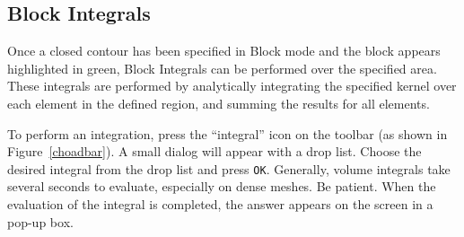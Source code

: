 \documentclass[12pt]{report}
\begin{document}
\subsection{Block Integrals}
Once a closed contour has been specified in Block mode and the
block appears highlighted in green, Block Integrals can be performed over
the specified area. These integrals are performed by analytically
integrating the specified kernel over each element in the defined
region, and summing the results for all elements.

To perform an integration, press the ``integral'' icon on the
toolbar (as shown in Figure~\ref{choadbar}).  A small dialog will
appear with a drop list.  Choose the desired integral from the drop
list and press {\tt OK}.  Generally, volume integrals take several
seconds to evaluate, especially on dense meshes.  Be patient. When
the evaluation of the integral is completed, the answer appears on
the screen in a pop-up box.
\end{document}
